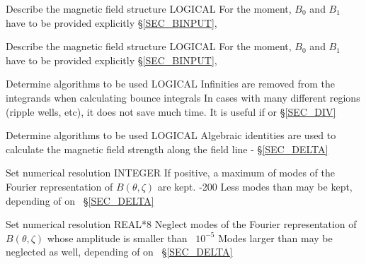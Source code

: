{Describe the magnetic field structure}
{LOGICAL}
{}
{\false}
{For the moment, $B_0$ and $B_1$ have to be provided explicitly}
{\S\ref{SEC_BINPUT}, \citep{calvo2017sqrtnu,velasco2018phi1}}

{Describe the magnetic field structure}
{LOGICAL}
{}
{\false}
{For the moment, $B_0$ and $B_1$ have to be provided explicitly}
{\S\ref{SEC_BINPUT}, \citep{calvo2017sqrtnu,velasco2018phi1}}




{Determine algorithms to be used}
{LOGICAL}
{Infinities are removed from the integrands when calculating bounce integrals}
{\false}
{In cases with many different regions (ripple wells, etc), it does not save much time. It is useful if  or }
{\S\ref{SEC_DIV}}

{Determine algorithms to be used}
{LOGICAL}
{Algebraic identities are used to calculate the magnetic field strength along the field line}
{\true}
{-}
{\S\ref{SEC_DELTA}}

{Set numerical resolution}
{INTEGER}
{If positive, a maximum of  modes of the Fourier representation of $B(\theta,\zeta)$ are kept.}
{-200}
{Less modes than  may be kept, depending of on~}
{\S\ref{SEC_DELTA}}

{Set numerical resolution}
{REAL*8}
{Neglect modes of the Fourier representation of $B(\theta,\zeta)$ whose amplitude is smaller than~}
{$10^{-5}$}
{Modes larger than  may be neglected as well, depending of on~}
{\S\ref{SEC_DELTA}}

